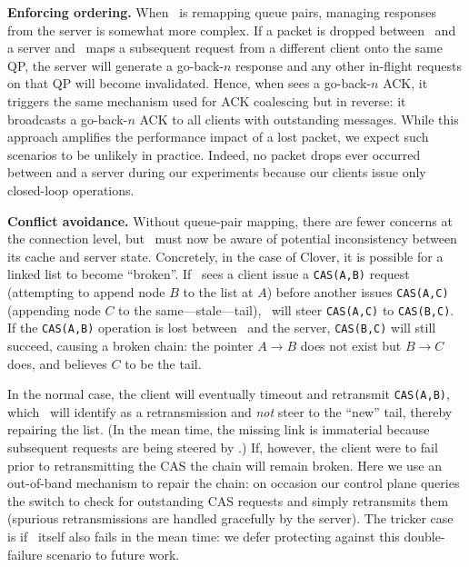 \textbf{Enforcing ordering.}
When \sword\ is remapping queue pairs, managing responses from the
server is somewhat more complex.  If a packet is dropped between
\sword\ and a server and \sword\ maps a subsequent request from a
different client onto the same QP, the server will generate a
go-back-$n$ response and any other in-flight requests on that QP will
become invalidated.  Hence, when {\sword} sees a go-back-$n$ ACK, it
triggers the same mechanism used for ACK coalescing but in reverse: it
broadcasts a go-back-$n$ ACK to all clients with outstanding messages.
While this approach amplifies the performance impact of a lost packet,
we expect such scenarios to be unlikely in practice.  Indeed, no
packet drops ever occurred between {\sword} and a server during our
experiments because our clients issue only closed-loop operations.

\textbf{Conflict avoidance.} Without queue-pair mapping, there are
fewer concerns at the connection level, but \sword\ must now be aware
of potential inconsistency between its cache and server state.
Concretely, in the case of Clover, it is possible for a linked list to
become ``broken''.  If \sword\ sees a client issue a \texttt{CAS(A,B)}
request (attempting to append node $B$ to the list at $A$) before
another issues \texttt{CAS(A,C)} (appending node $C$ to the
same---stale---tail), \sword\ will steer \texttt{CAS(A,C)} to
\texttt{CAS(B,C)}. If the \texttt{CAS(A,B)} operation is lost between
\sword\ and the server, \texttt{CAS(B,C)} will still succeed, causing
a broken chain: the pointer $A\rightarrow B$ does not exist but
$B\rightarrow C$ does, and {\sword} believes $C$ to be the tail.

In the normal case, the client will eventually timeout and retransmit
\texttt{CAS(A,B)}, which \sword\ will identify as a retransmission and
\emph{not} steer to the ``new'' tail, thereby repairing the list.  (In
the mean time, the missing link is immaterial because
subsequent requests are being steered by \sword.)  If, however, the client
were to fail prior to retransmitting the CAS the chain will remain broken.
Here we use an out-of-band mechanism to repair the chain: on occasion
our control plane queries the switch to check for outstanding CAS
requests and simply retransmits them (spurious retransmissions are
handled gracefully by the server).  The tricker case is if
\sword\ itself also fails in the mean time: we defer protecting
against this double-failure scenario to future work.



